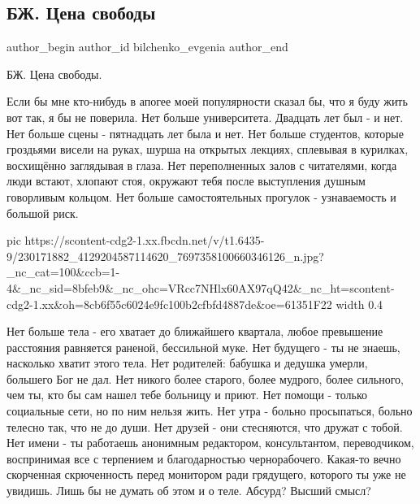  
 
 
 
 
 
\subsection{БЖ. Цена свободы}
\label{sec:06_08_2021.fb.bilchenko_evgenia.1.svoboda_cena}
 
\ifcmt
 author_begin
   author_id bilchenko_evgenia
 author_end
\fi

БЖ. Цена свободы.

Если бы мне кто-нибудь в апогее моей популярности сказал бы, что я буду жить
вот так, я бы не поверила. Нет больше университета. Двадцать лет был - и нет.
Нет больше сцены - пятнадцать лет была и нет. Нет больше студентов, которые
гроздьями висели на руках, шурша на открытых лекциях, сплевывая в курилках,
восхищённо заглядывая в глаза. Нет переполненных залов с читателями, когда люди
встают, хлопают стоя, окружают тебя после выступления душным говорливым
кольцом. Нет больше самостоятельных прогулок - узнаваемость и большой риск. 

\ifcmt
  pic https://scontent-cdg2-1.xx.fbcdn.net/v/t1.6435-9/230171882_4129204587114620_7697358100660346126_n.jpg?_nc_cat=100&ccb=1-4&_nc_sid=8bfeb9&_nc_ohc=VRcc7NHlx60AX97qQ42&_nc_ht=scontent-cdg2-1.xx&oh=8cb6f55c6024e9fc100b2cfbfd4887de&oe=61351F22
  width 0.4
\fi

Нет больше тела - его хватает до ближайшего квартала, любое превышение
расстояния равняется раненой, бессильной муке. Нет будущего - ты не знаешь,
насколько хватит этого тела. Нет родителей: бабушка и дедушка умерли, большего
Бог не дал. Нет никого более старого, более мудрого, более сильного, чем ты,
кто бы сам нашел тебе больницу и приют. Нет помощи - только социальные сети, но
по ним нельзя жить. Нет утра - больно просыпаться, больно телесно так, что не
до души. Нет друзей - они стесняются, что дружат с тобой. Нет имени - ты
работаешь анонимным редактором, консультантом, переводчиком, воспринимая все с
терпением и благодарностью чернорабочего. Какая-то вечно скорченная
скрюченность перед монитором ради грядущего, которого ты уже не увидишь. Лишь
бы не думать об этом и о теле. Абсурд? Высший смысл?

